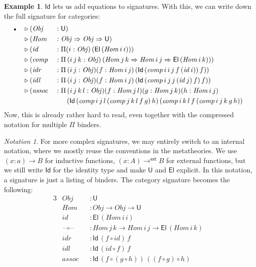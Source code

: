 \documentclass[12pt,a4paper,twoside,openany]{book}
\theoremstyle{remark}
\newtheorem{notation}{Notation}
\theoremstyle{definition}
\newtheorem{myexample}{Example}
\theoremstyle{theorem}
\newcommand{\mi}[1]{\mathit{#1}}
\newcommand{\ms}[1]{\mathsf{#1}}
\newcommand{\U}{\mathsf{U}}
\newcommand{\El}{\mathsf{El}}
\newcommand{\Id}{\mathsf{Id}}
\newcommand{\blank}{\mathord{\hspace{1pt}\text{--}\hspace{1pt}}}
\newcommand{\ext}{\triangleright}
\newcommand{\emptycon}{\scaleobj{.75}\bullet}
\newcommand{\funi}{\Rightarrow}
\newcommand{\toe}{\to^{\ms{ext}}}
\begin{document}
\begin{myexample} $\Id$ lets us add equations to signatures. With this, we can write down the full
signature for categories:
\begin{alignat*}{3}
  & \emptycon &&\ext (\mi{Obj}   &&: \U)\\
  &           &&\ext (\mi{Hom}   &&: \mi{Obj} \funi \mi{Obj} \funi \U)\\
  &           &&\ext (\mi{id}    &&: \Pi(i : \mi{Obj})\,(\El\,(\mi{Hom}\,i\,i)))\\
  &           &&\ext (\mi{comp}  &&: \Pi\,(i\,j\,k : \mi{Obj})\,(\mi{Hom}\,j\,k \funi \mi{Hom}\,i\,j \funi \El\,(\mi{Hom}\,i\,k)))\\
  &           &&\ext (\mi{idr}   &&: \Pi\,(i\,j : \mi{Obj})(f : \mi{Hom}\,i\,j)\,(\Id\,(\mi{comp}\,i\,i\,j\,f\,(\mi{id}\,i))\,f))\\
  &           &&\ext (\mi{idl}   &&: \Pi\,(i\,j : \mi{Obj})(f : \mi{Hom}\,i\,j)\,(\Id\,(\mi{comp}\,i\,j\,j\,(\mi{id}\,j)\,f)\,f))\\
  &           &&\ext (\mi{assoc} &&: \Pi\,(i\,j\,k\,l : \mi{Obj})(f : \mi{Hom}\,j\,l)(g : \mi{Hom}\,j\,k)(h : \mi{Hom}\,i\,j)\\
  &           && &&\hspace{1.7em} (\Id
                 \,(\mi{comp}\,i\,j\,l\,(\mi{comp}\,j\,k\,l\,f\,g)\,h)
                 \,(\mi{comp}\,i\,k\,l\,f\,(\mi{comp}\,i\,j\,k\,g\,h))
\end{alignat*}
Now, this is already rather hard to read, even together with the compressed
notation for multiple $\Pi$ binders.
\begin{notation}
For more complex signatures, we may entirely switch to an internal notation,
where we mostly reuse the conventions in the metatheories. We use $(x :
a) \to B$ for inductive functions, $(x : A) \toe B$ for external functions,
but we still write $\Id$ for the identity type and make $\U$ and $\El$
explicit. In this notation, a signature is just a listing of binders. The category
signature becomes the following:
\begin{alignat*}{3}
  & \mi{Obj} &&: \U\\
  & \mi{Hom} &&: \mi{Obj} \to \mi{Obj} \to \U\\
  & \mi{id}  &&: \El\,(\mi{Hom}\,i\,i)\\
  & \mi{\blank\!\circ\!\blank} &&: \mi{Hom}\,j\,k \to \mi{Hom}\,i\,j \to \El\,(\mi{Hom}\,i\,k)\\
  & \mi{idr} &&: \Id\,(f \circ \mi{id})\,f\\
  & \mi{idl} &&: \Id\,(\mi{id} \circ f)\,f\\
  & \mi{assoc} &&: \Id\,(f \circ (g \circ h))\,((f \circ g) \circ h)
\end{alignat*}
\end{notation}
\end{myexample}
\end{document}
